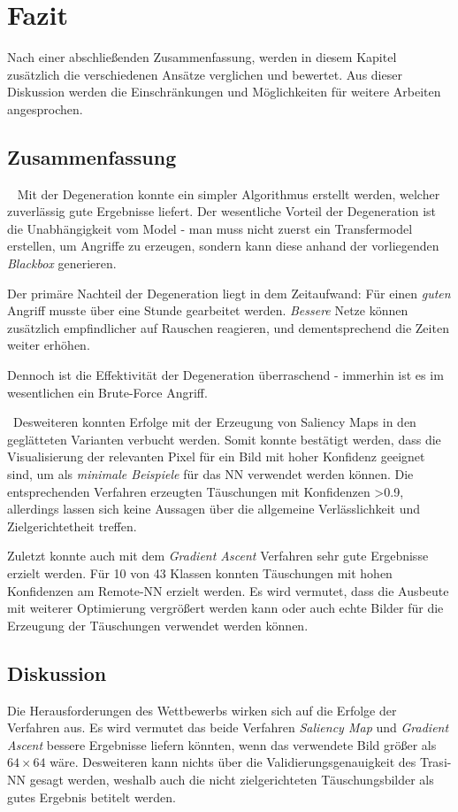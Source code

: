 \chapter{Fazit}
\label{cha:Fazit} \label{cha:Schluss}
Nach einer abschließenden Zusammenfassung, werden in diesem Kapitel zusätzlich die verschiedenen Ansätze verglichen und bewertet. Aus dieser Diskussion werden die Einschränkungen und Möglichkeiten für weitere Arbeiten angesprochen.

\section{Zusammenfassung} ~\newline 
Mit der Degeneration konnte ein simpler Algorithmus erstellt werden, welcher zuverlässig gute Ergebnisse liefert. 
Der wesentliche Vorteil der Degeneration ist die Unabhängigkeit vom Model - man muss nicht zuerst ein Transfermodel erstellen, um Angriffe zu erzeugen, sondern kann diese anhand der vorliegenden \textit{Blackbox} generieren.  

Der primäre Nachteil der Degeneration liegt in dem Zeitaufwand: Für einen \textit{guten} Angriff musste über eine Stunde gearbeitet werden. \textit{Bessere} Netze können zusätzlich empfindlicher auf Rauschen reagieren, und dementsprechend die Zeiten weiter erhöhen. 
  
Dennoch ist die Effektivität der Degeneration überraschend - immerhin ist es im wesentlichen ein Brute-Force Angriff. 

~\newline Desweiteren konnten Erfolge mit der Erzeugung von Saliency Maps in den geglätteten Varianten verbucht werden. Somit konnte bestätigt werden, dass die Visualisierung der relevanten Pixel für ein Bild mit hoher Konfidenz geeignet sind, um als \textit{minimale Beispiele} für das NN verwendet werden können. 
Die entsprechenden Verfahren erzeugten Täuschungen mit Konfidenzen >0.9, allerdings lassen sich keine Aussagen über die allgemeine Verlässlichkeit und Zielgerichtetheit treffen.

Zuletzt konnte auch mit dem \textit{Gradient Ascent} Verfahren sehr gute Ergebnisse erzielt werden. Für 10 von 43 Klassen konnten Täuschungen mit hohen Konfidenzen am Remote-NN erzielt werden. Es wird vermutet, dass die Ausbeute mit weiterer Optimierung vergrößert werden kann oder auch echte Bilder für die Erzeugung der Täuschungen verwendet werden können.

\section{Diskussion}
Die Herausforderungen des Wettbewerbs wirken sich auf die Erfolge der Verfahren aus. Es wird vermutet das beide Verfahren \textit{Saliency Map} und \textit{Gradient Ascent} bessere Ergebnisse liefern könnten, wenn das verwendete Bild größer als $64\times64$ wäre. Desweiteren kann nichts über die Validierungsgenauigkeit des Trasi-NN gesagt werden, weshalb auch die nicht zielgerichteten Täuschungsbilder als gutes Ergebnis betitelt werden. 


